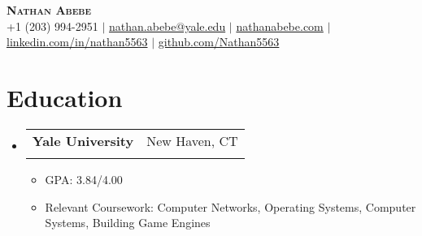 \documentclass[letterpaper,11pt]{article}
\makeatletter
\newcommand{\resumeItem}[1]{
  \item\small{
    {#1 \vspace{-2pt}}
  }
}
\newcommand{\resumeSubheading}[4]{
  \vspace{-2pt}\item
    \begin{tabular*}{0.97\textwidth}[t]{l@{\extracolsep{\fill}}r}
      \textbf{#1} & #2 \\
      \text{\small#3} & \text{\small #4} \\
    \end{tabular*}\vspace{-7pt}
}
\newcommand{\resumeSubHeadingListStart}{\begin{itemize}[leftmargin=0.15in, label={}]}
\newcommand{\resumeSubHeadingListEnd}{\end{itemize}}
\newcommand{\resumeItemListStart}{\begin{itemize}}
\newcommand{\resumeItemListEnd}{\end{itemize}\vspace{-5pt}}
\makeatother
\begin{document}
\begin{center}
    \textbf{\Huge \scshape Nathan Abebe} \\ \vspace{5pt}
    \small +1 (203) 994-2951 $|$ \href{mailto:nathan.abebe@yale.edu}{nathan.abebe@yale.edu} $|$ \href{https://nathanabebe.com}{nathanabebe.com} $|$ 
    \href{https://linkedin.com/in/nathan5563}{linkedin.com/in/nathan5563} $|$
    \href{https://github.com/Nathan5563}{github.com/Nathan5563}
\end{center}

\section{Education}
  \resumeSubHeadingListStart
    \resumeSubheading
      {Yale University}{New Haven, CT}
      {B.S. Computer Science, B.S. Electrical Engineering (ABET)}{May 2028}
      \resumeItemListStart
        \resumeItem{GPA: 3.84/4.00}
        \resumeItem{Relevant Coursework: Computer Networks, Operating Systems, Computer Systems, Building Game Engines }
      \resumeItemListEnd
  \resumeSubHeadingListEnd


\end{document}
